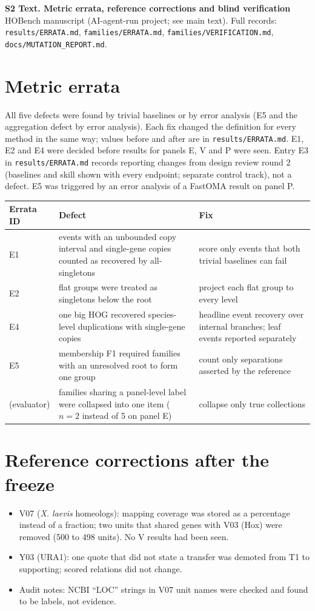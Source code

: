 \documentclass[10pt]{article}
\begin{document}
{\large\textbf{S2 Text. Metric errata, reference corrections and blind verification}}\\[2pt]
HOBench manuscript (AI-agent-run project; see main text). Full records: \texttt{results/ERRATA.md},
\texttt{families/ERRATA.md}, \texttt{families/VERIFICATION.md}, \texttt{docs/MUTATION\_REPORT.md}.

\section*{Metric errata}
All five defects were found by trivial baselines or by error analysis (E5 and the aggregation defect by error analysis). Each fix changed the definition for every
method in the same way; values before and after are in \texttt{results/ERRATA.md}. E1, E2 and E4 were decided before
results for panels E, V and P were seen. Entry E3 in \texttt{results/ERRATA.md} records reporting changes from design
review round 2 (baselines and skill shown with every endpoint; separate control track), not a defect. E5 was triggered by an error analysis of a FastOMA result on panel P.
\begin{tabular}{p{1cm}p{7cm}p{7cm}}
\toprule
Errata ID & Defect & Fix \\
\midrule
E1 & events with an unbounded copy interval and single-gene copies counted as recovered by all-singletons & score only events that both trivial baselines can fail \\
E2 & flat groups were treated as singletons below the root & project each flat group to every level \\
E4 & one big HOG recovered species-level duplications with single-gene copies & headline event recovery over internal branches; leaf events reported separately \\
E5 & membership F1 required families with an unresolved root to form one group & count only separations asserted by the reference \\
(evaluator) & families sharing a panel-level label were collapsed into one item ($n=2$ instead of 5 on panel E) & collapse only true collections \\
\bottomrule
\end{tabular}

\section*{Reference corrections after the freeze}
\begin{itemize}
\item V07 (\textit{X. laevis} homeologs): mapping coverage was stored as a percentage instead of a fraction; two units
that shared genes with V03 (Hox) were removed (500 to 498 units). No V results had been seen.
\item Y03 (URA1): one quote that did not state a transfer was demoted from T1 to supporting; scored relations did not change.
\item Audit notes: NCBI ``LOC'' strings in V07 unit names were checked and found to be labels, not evidence.
\end{itemize}
\end{document}

